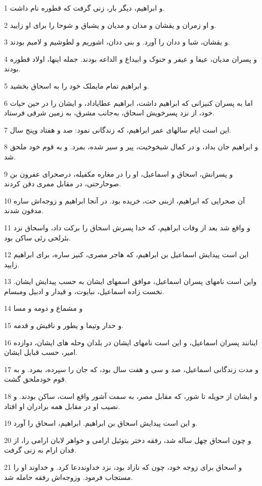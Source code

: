 \par 1 و ابراهیم، دیگر بار، زنی گرفت که قطوره نام داشت.
\par 2 و او زمران و یقشان و مدان و مدیان و یشباق و شوحا را برای او زایید.
\par 3 و یقشان، شبا و ددان را آورد. و بنی ددان، اشوریم و لطوشیم و لامیم بودند.
\par 4 و پسران مدیان، عیفا و عیفر و حنوک و ابیداع و الداعه بودند. جمله اینها، اولاد قطوره بودند.
\par 5 و ابراهیم تمام مایملک خود را به اسحاق بخشید.
\par 6 اما به پسران کنیزانی که ابراهیم داشت، ابراهیم عطایاداد، و ایشان را در حین حیات خود، از نزد پسرخویش اسحاق، به‌جانب مشرق، به زمین شرقی فرستاد. 
\par 7 این است ایام سالهای عمر ابراهیم، که زندگانی نمود: صد و هفتاد وپنج سال.
\par 8 و ابراهیم جان بداد، و در کمال شیخوخیت، پیر و سیر شده، بمرد. و به قوم خود ملحق شد.
\par 9 و پسرانش، اسحاق و اسماعیل، او را در مغاره مکفیله، درصحرای عفرون بن صوحارحتی، در مقابل ممری دفن کردند.
\par 10 آن صحرایی که ابراهیم، ازبنی حت، خریده بود. در آنجا ابراهیم و زوجه‌اش ساره مدفون شدند.
\par 11 و واقع شد بعد از وفات ابراهیم، که خدا پسرش اسحاق را برکت داد، واسحاق نزد بئرلحی رئی ساکن بود.
\par 12 این است پیدایش اسماعیل بن ابراهیم، که هاجر مصری، کنیز ساره، برای ابراهیم زایید.
\par 13 واین است نامهای پسران اسماعیل، موافق اسمهای ایشان به حسب پیدایش ایشان. نخست زاده اسماعیل، نبایوت، و قیدار و ادبیل ومبسام.
\par 14 و مشماع و دومه و مسا
\par 15 و حدار وتیما و یطور و نافیش و قدمه.
\par 16 اینانند پسران اسماعیل، و این است نامهای ایشان در بلدان وحله های ایشان، دوازده امیر، حسب قبایل ایشان.
\par 17 و مدت زندگانی اسماعیل، صد و سی و هفت سال بود، که جان را سپرده، بمرد. و به قوم خودملحق گشت.
\par 18 و ایشان از حویله تا شور، که مقابل مصر، به سمت آشور واقع است، ساکن بودند. و نصیب او در مقابل همه برادران او افتاد.
\par 19 و این است پیدایش اسحاق بن ابراهیم. ابراهیم، اسحاق را آورد.
\par 20 و چون اسحاق چهل ساله شد، رفقه دختر بتوئیل ارامی و خواهر لابان ارامی را، از فدان ارام به زنی گرفت.
\par 21 و اسحاق برای زوجه خود، چون که نازاد بود، نزد خداونددعا کرد. و خداوند او را مستجاب فرمود. وزوجه‌اش رفقه حامله شد.
